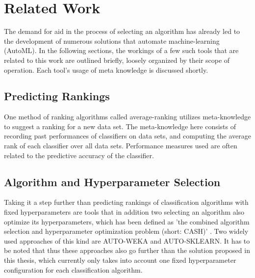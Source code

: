 \chapter{Related Work}
\label{sec:related}
The demand for aid in the process of selecting an algorithm has already led to the development of numerous solutions that automate machine-learning (AutoML). In the following sections, the workings of a few such tools that are related to this work are outlined briefly, loosely organized by their scope of operation. Each tool's usage of meta knowledge is discussed shortly.\\ 

\section{Predicting Rankings}


One method of ranking algorithms called average-ranking utilizes meta-knowledge to suggest a ranking for a new data set. The meta-knowledge here consists of recording past performances of classifiers on data sets, and computing the average rank of each classifier over all data sets. Performance measures used are often related to the predictive accuracy of the classifier. 


\cite{DBLP:journals/ml/AbdulrahmanBRV18}

\section{Algorithm and Hyperparameter Selection}
Taking it a step further than predicting rankings of classification algorithms with fixed hyperparameters are tools that in addition two selecting an algorithm also optimize its hyperparameters, which has been defined as 'the combined algorithm selection and hyperparameter optimization problem (short: CASH)' \cite{thornton2013auto}. Two widely used approaches of this kind are AUTO-WEKA and AUTO-SKLEARN. It has to be noted that thus these approaches also go further than the solution proposed in this thesis, which currently only takes into account one fixed hyperparameter configuration for each classification algorithm. 

